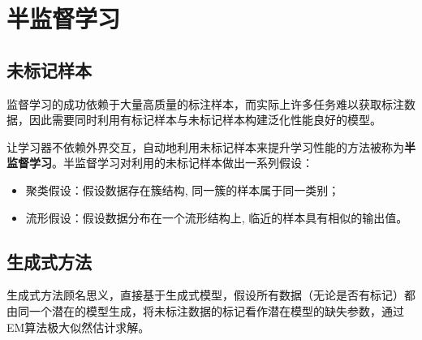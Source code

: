 \chapter{半监督学习}

\section{未标记样本}\label{sec:12.1}
监督学习的成功依赖于大量高质量的标注样本，而实际上许多任务难以获取标注数据，因此需要同时利用有标记样本与未标记样本构建泛化性能良好的模型。

让学习器不依赖外界交互，自动地利用未标记样本来提升学习性能的方法被称为\textbf{半监督学习}。半监督学习对利用的未标记样本做出一系列假设：

\begin{itemize}
    \item 聚类假设：假设数据存在簇结构, 同一簇的样本属于同一类别；
    \item 流形假设：假设数据分布在一个流形结构上, 临近的样本具有相似的输出值。
\end{itemize}


\section{生成式方法}\label{sec:12.2}
生成式方法顾名思义，直接基于生成式模型，假设所有数据（无论是否有标记）都由同一个潜在的模型生成，将未标注数据的标记看作潜在模型的缺失参数，通过EM算法极大似然估计求解。

